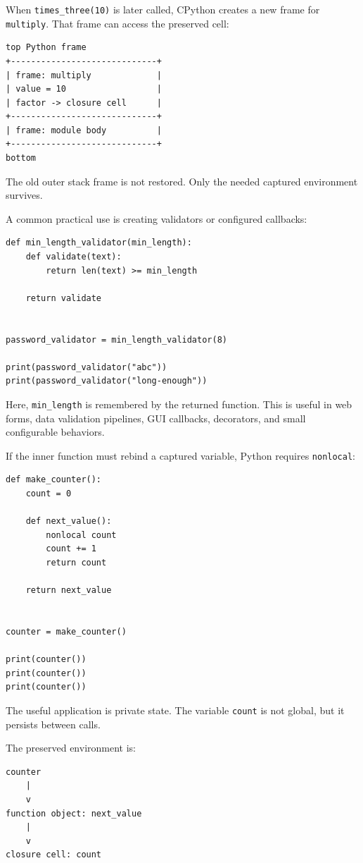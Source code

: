 When \texttt{times\_three(10)} is later called, CPython creates a new frame for \texttt{multiply}. That frame can access the preserved cell:

\begin{verbatim}
top Python frame
+-----------------------------+
| frame: multiply             |
| value = 10                  |
| factor -> closure cell      |
+-----------------------------+
| frame: module body          |
+-----------------------------+
bottom
\end{verbatim}

The old outer stack frame is not restored. Only the needed captured environment survives.

A common practical use is creating validators or configured callbacks:

\begin{verbatim}
def min_length_validator(min_length):
    def validate(text):
        return len(text) >= min_length

    return validate


password_validator = min_length_validator(8)

print(password_validator("abc"))
print(password_validator("long-enough"))
\end{verbatim}

Here, \texttt{min\_length} is remembered by the returned function. This is useful in web forms, data validation pipelines, GUI callbacks, decorators, and small configurable behaviors.

If the inner function must rebind a captured variable, Python requires \texttt{nonlocal}:

\begin{verbatim}
def make_counter():
    count = 0

    def next_value():
        nonlocal count
        count += 1
        return count

    return next_value


counter = make_counter()

print(counter())
print(counter())
print(counter())
\end{verbatim}

The useful application is private state. The variable \texttt{count} is not global, but it persists between calls.

The preserved environment is:

\begin{verbatim}
counter
    |
    v
function object: next_value
    |
    v
closure cell: count
\end{verbatim}

